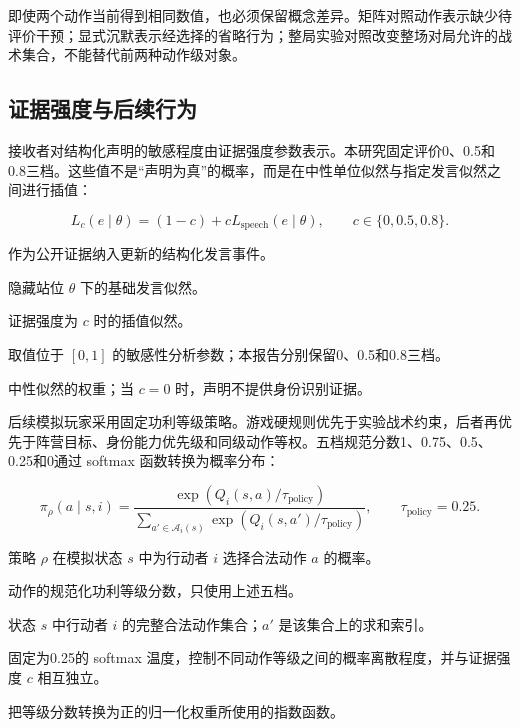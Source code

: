 \documentclass[UTF8,11pt,a4paper,fontset=windows]{ctexart}
\begin{document}
即使两个动作当前得到相同数值，也必须保留概念差异。矩阵对照动作表示缺少待评价干预；显式沉默表示经选择的省略行为；整局实验对照改变整场对局允许的战术集合，不能替代前两种动作级对象。

\subsection{证据强度与后续行为}

接收者对结构化声明的敏感程度由证据强度参数表示。本研究固定评价0、0.5和0.8三档。这些值不是“声明为真”的概率，而是在中性单位似然与指定发言似然之间进行插值：

\[
L_c(e\mid\theta)=(1-c)+cL_{\mathrm{speech}}(e\mid\theta),
\qquad c\in\{0,0.5,0.8\}.
\]

\begin{description}[style=nextline,leftmargin=3.4cm,labelwidth=3.0cm]
  \item[$e$] 作为公开证据纳入更新的结构化发言事件。
  \item[$L_{\mathrm{speech}}(e\mid\theta)$] 隐藏站位 $\theta$ 下的基础发言似然。
  \item[$L_c(e\mid\theta)$] 证据强度为 $c$ 时的插值似然。
  \item[$c$] 取值位于 $[0,1]$ 的敏感性分析参数；本报告分别保留0、0.5和0.8三档。
  \item[$1-c$] 中性似然的权重；当 $c=0$ 时，声明不提供身份识别证据。
\end{description}

后续模拟玩家采用固定功利等级策略。游戏硬规则优先于实验战术约束，后者再优先于阵营目标、身份能力优先级和同级动作等权。五档规范分数1、0.75、0.5、0.25和0通过 softmax 函数转换为概率分布：

\[
\pi_{\rho}(a\mid s,i)=
\frac{\exp(Q_i(s,a)/\tau_{\mathrm{policy}})}
{\sum_{a'\in\mathcal A_i(s)}\exp(Q_i(s,a')/\tau_{\mathrm{policy}})},
\qquad \tau_{\mathrm{policy}}=0.25.
\]

\begin{description}[style=nextline,leftmargin=3.4cm,labelwidth=3.0cm]
  \item[$\pi_{\rho}(a\mid s,i)$] 策略 $\rho$ 在模拟状态 $s$ 中为行动者 $i$ 选择合法动作 $a$ 的概率。
  \item[$Q_i(s,a)$] 动作的规范化功利等级分数，只使用上述五档。
  \item[$\mathcal A_i(s)$] 状态 $s$ 中行动者 $i$ 的完整合法动作集合；$a'$ 是该集合上的求和索引。
  \item[$\tau_{\mathrm{policy}}$] 固定为0.25的 softmax 温度，控制不同动作等级之间的概率离散程度，并与证据强度 $c$ 相互独立。
  \item[$\exp$] 把等级分数转换为正的归一化权重所使用的指数函数。
\end{description}
\end{document}
